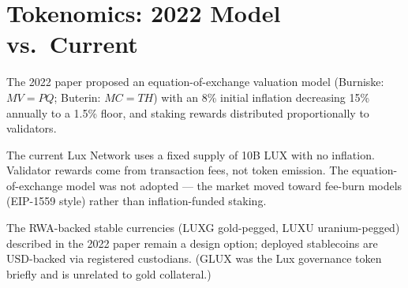 \section{Tokenomics: 2022 Model vs.\ Current}


The 2022 paper proposed an equation-of-exchange valuation model
(Burniske: $MV = PQ$; Buterin: $MC = TH$) with an 8\% initial
inflation decreasing 15\% annually to a 1.5\% floor, and
staking rewards distributed proportionally to validators.

The current Lux Network uses a fixed supply of 10B LUX with no
inflation. Validator rewards come from transaction fees, not
token emission. The equation-of-exchange model was not adopted
--- the market moved toward fee-burn models (EIP-1559 style)
rather than inflation-funded staking.

The RWA-backed stable currencies (LUXG gold-pegged, LUXU
uranium-pegged) described in the 2022 paper remain a design
option; deployed stablecoins are USD-backed via registered
custodians. (GLUX was the Lux governance token briefly and
is unrelated to gold collateral.)

